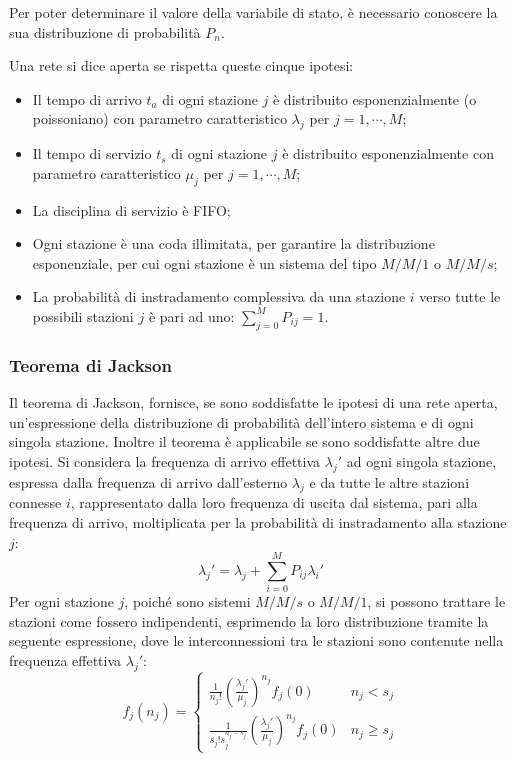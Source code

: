 \documentclass{article}
\numberwithin{equation}{subsection}
\begin{document}
Per poter determinare il valore della variabile di stato, è necessario conoscere la sua distribuzione di probabilità $P_n$. 

Una rete si dice aperta se rispetta queste cinque ipotesi:
\begin{itemize}
    \item Il tempo di arrivo $t_a$ di ogni stazione $j$ è distribuito esponenzialmente (o poissoniano) con parametro caratteristico $\lambda_j$ per $j=1,\cdots,M$;
    \item Il tempo di servizio $t_s$ di ogni stazione $j$ è distribuito esponenzialmente con parametro caratteristico $\mu_j$ per $j=1,\cdots, M$;
    \item La disciplina di servizio è FIFO;
    \item Ogni stazione è una coda illimitata, per garantire la distribuzione esponenziale, per cui ogni stazione è un sistema del tipo $M/M/1$ o $M/M/s$;
    \item La probabilità di instradamento complessiva da una stazione $i$ verso tutte le possibili stazioni $j$ è pari ad uno: $\displaystyle\sum_{j=0}^{M}P_{ij}=1$.
\end{itemize} 

\subsubsection{Teorema di Jackson}

Il teorema di Jackson, fornisce, se sono soddisfatte le ipotesi di una rete aperta, un'espressione della distribuzione di probabilità dell'intero sistema e di ogni singola 
stazione. 
Inoltre il teorema è applicabile se sono soddisfatte altre due ipotesi. 
Si considera la frequenza di arrivo effettiva $\lambda_j'$ ad ogni singola stazione, espressa dalla frequenza di arrivo dall'esterno $\lambda_j$ e da tutte le altre stazioni 
connesse $i$, rappresentato dalla loro frequenza di uscita dal sistema, pari alla frequenza di arrivo, moltiplicata per la probabilità di instradamento alla stazione $j$:
\begin{equation}
    \lambda_j'=\lambda_j+\displaystyle\sum_{i=0}^{M}P_{ij}\lambda_i'
\end{equation}
Per ogni stazione $j$, poiché sono sistemi $M/M/s$ o $M/M/1$, si possono trattare le stazioni come fossero indipendenti, esprimendo la loro distribuzione tramite 
la seguente espressione, dove le interconnessioni tra le stazioni sono contenute nella frequenza effettiva $\lambda_j'$: 
\begin{equation}
    f_j(n_j)=\begin{cases}
        \displaystyle\frac{1}{n_j!}\left(\frac{\lambda_j'}{\mu_j}\right)^{n_j}f_j(0)&n_j<s_j\\
        \displaystyle\frac{1}{s_j!s_j^{n_j-s_j}}\left(\frac{\lambda_j'}{\mu_j}\right)^{n_j}f_j(0)&n_j\geq s_j
    \end{cases}
\end{equation}
\end{document}
